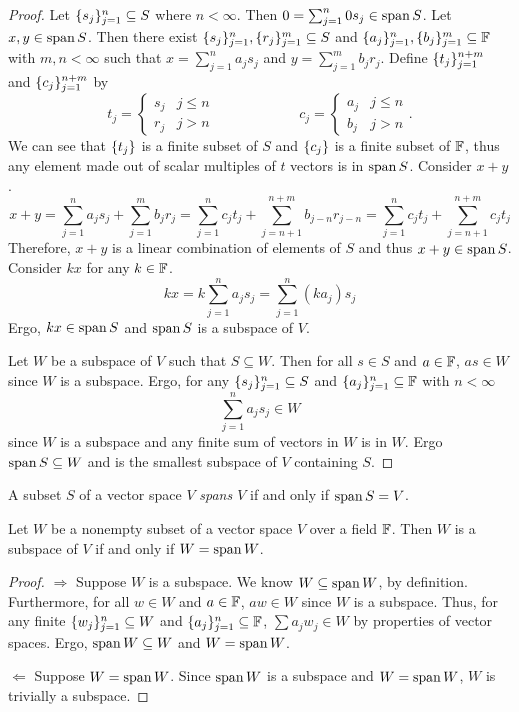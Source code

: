 \begin{proof}
	Let $\lbrace s_j \rbrace_{j=1}^n\subseteq S$ where $n < \infty$.
	Then $0=\sum_{j=1}^n 0 s_j\in\operatorname{span} S$.
	Let $x,y\in\operatorname{span} S$.
	Then there exist $\lbrace s_j \rbrace_{j=1}^n,\lbrace r_j \rbrace_{j=1}^m\subseteq S$ and $\lbrace a_j \rbrace_{j=1}^n,\lbrace b_j \rbrace_{j=1}^m\subseteq\mathbb{F}$ with $m,n <\infty$ such that $x=\sum_{j=1}^n a_js_j$ and $y=\sum_{j=1}^mb_jr_j$.
	Define $\lbrace t_j \rbrace_{j=1}^{n+m}$ and $\lbrace c_j \rbrace_{j=1}^{n+m}$ by
	\[
		t_j =
		\begin{cases}
			s_j & j\leq n\\
			r_j & j > n
		\end{cases}
		\hspace{1in}
		c_j =
		\begin{cases}
			a_j & j \leq n\\
			b_j & j > n
		\end{cases}.
	\]
	We can see that $\lbrace t_j \rbrace$ is a finite subset of $S$ and $\lbrace c_j \rbrace$ is a finite subset of $\mathbb{F}$, thus any element made out of scalar multiples of $t$ vectors is in $\operatorname{span} S$.
	Consider $x+y$.
	\[
		x+y = \sum_{j=1}^n a_js_j + \sum_{j=1}^mb_jr_j
		= \sum_{j=1}^n c_jt_j + \sum_{j=n+1}^{n+m}b_{j-n}r_{j-n}
		= \sum_{j=1}^n c_jt_j + \sum_{j=n+1}^{n+m} c_jt_j
	\]
	Therefore, $x+y$ is a linear combination of elements of $S$ and thus $x+y\in\operatorname{span} S$.
	Consider $kx$ for any $k\in\mathbb{F}$.
	\[
		kx=k\sum_{j=1}^n a_js_j=\sum_{j=1}^n (ka_j)s_j
	\]
	Ergo, $kx\in\operatorname{span} S$ and $\operatorname{span} S$ is a subspace of $V$.

	Let $W$ be a subspace of $V$ such that $S\subseteq W$.
	Then for all $s\in S$ and $a\in\mathbb{F}$, $as\in W$ since $W$ is a subspace.
	Ergo, for any $\lbrace s_j \rbrace_{j=1}^n\subseteq S$ and $\lbrace a_j \rbrace_{j=1}^n\subseteq\mathbb{F}$ with $n < \infty$
	\[
		\sum_{j=1}^n a_js_j\in W
	\]
	since $W$ is a subspace and any finite sum of vectors in $W$ is in $W$.
	Ergo $\operatorname{span} S\subseteq W$ and is the smallest subspace of $V$ containing $S$.
\end{proof}

\begin{definition}[Span]
A subset $S$ of a vector space $V$ \textit{spans $V$} if and only if $\operatorname{span} S=V$.
\end{definition}

\begin{proposition}
	Let $W$ be a nonempty subset of a vector space $V$ over a field $\mathbb{F}$.
	Then $W$ is a subspace of $V$ if and only if $W=\operatorname{span} W$.
\end{proposition}
\begin{proof}
	$\Rightarrow$ Suppose $W$ is a subspace.
	We know $W\subseteq\operatorname{span} W$, by definition.
	Furthermore, for all $w\in W$ and $a\in\mathbb{F}$, $aw\in W$ since $W$ is a subspace.
	Thus, for any finite $\lbrace w_j \rbrace_{j=1}^n\subseteq W$ and $\lbrace a_j \rbrace_{j=1}^n\subseteq\mathbb{F}$, $\sum a_jw_j\in W$ by properties of vector spaces.
	Ergo, $\operatorname{span} W\subseteq W$ and $W=\operatorname{span} W$.

	$\Leftarrow$ Suppose $W=\operatorname{span} W$.
	Since $\operatorname{span} W$ is a subspace and $W=\operatorname{span} W$, $W$ is trivially a subspace.
\end{proof}

